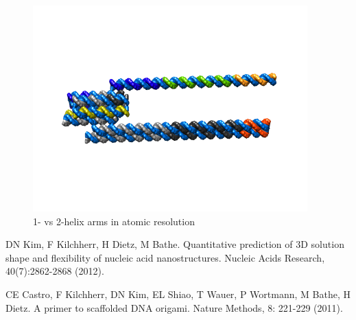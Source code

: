 \documentclass{article}
\begin{document}
\begin{figure}
\includegraphics[width=300pt]{single_arm_vs_double_atomic}
\caption{1- vs 2-helix arms in atomic resolution}
  \label{fig:single_arm3}
\end{figure}


\begin{thebibliography}{9}

    DN Kim, F Kilchherr, H Dietz, M Bathe. Quantitative prediction of 3D solution shape and flexibility of nucleic acid nanostructures. Nucleic Acids Research, 40(7):2862-2868 (2012).

    CE Castro, F Kilchherr, DN Kim, EL Shiao, T Wauer, P Wortmann, M Bathe, H Dietz. A primer to scaffolded DNA origami. Nature Methods, 8: 221-229 (2011).

\end{thebibliography}
\end{document}
